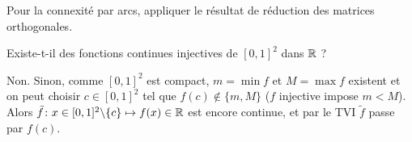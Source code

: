 \begin{solution}
    Pour la connexité par arcs, appliquer le résultat de réduction des matrices orthogonales.
\end{solution}

\begin{exo}
    \label{evn6}
    Existe-t-il des fonctions continues injectives de $[0,1]^2$ dans $\operatorname{\mathbb R}$ ?
\end{exo}

\begin{solution}
    Non. Sinon, comme $[0,1]^2$ est compact, $m = \min f$ et $M = \max f$ existent et
    on peut choisir $c\in[0,1]^2$ tel que $f(c)\notin\lbrace m,M\rbrace$ ($f$ injective impose $m<M$). 
    Alors $\tilde f\colon x\in[0,1]^2\backslash\lbrace c\rbrace\mapsto f(x)\in\operatorname{\mathbb R}$ est encore continue, et par le TVI $\tilde f$ passe par $f(c)$.
\end{solution}